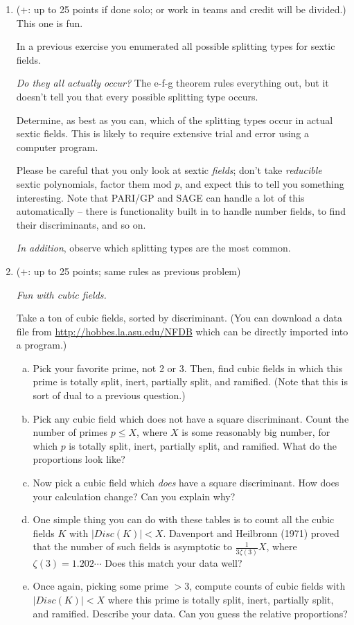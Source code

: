 \documentclass[12pt]{article}
\begin{document}
\begin{enumerate}
\item (+: up to 25 points if done solo; or work in teams and credit will be divided.)
This one is fun.

In a previous exercise you enumerated all possible splitting types for sextic fields.

{\itshape Do they all actually occur?} The e-f-g theorem rules everything out, but it doesn't tell you that
every possible splitting type occurs.

Determine, as best as you can, which of the splitting types occur in actual sextic fields. This is likely
to require extensive trial and error using a computer program.

Please be careful that you only look at sextic {\itshape fields}; don't take {\itshape reducible} sextic
polynomials, factor them mod $p$, and expect this to tell you something interesting. Note that PARI/GP and SAGE
can handle a lot of this automatically -- there is functionality built in to handle number fields, to find
their discriminants, and so on.

{\itshape In addition}, observe which splitting types are the most common. 

\item (+: up to 25 points; same rules as previous problem)

{\itshape Fun with cubic fields.}

Take a ton of cubic fields, sorted by discriminant. (You can download a data
file from \url{http://hobbes.la.asu.edu/NFDB} which can be directly imported into a program.)

\begin{enumerate}[(a)]
\item
Pick your favorite prime, not 2 or 3. Then, find cubic fields in which this prime is totally
split, inert, partially split, and ramified. (Note that this is sort of dual to a previous
question.)
\item
Pick any cubic field which does not have a square discriminant. Count the number of primes $p \leq X$,
where $X$ is some reasonably big number, for which $p$ is totally split, inert, partially split, and ramified. 
What do the proportions look like?
\item
Now pick a cubic field which {\itshape does} have a square discriminant. How does your calculation change?
Can you explain why?
\item
One simple thing you can do with these tables is to count all the cubic fields $K$ with $|Disc(K)| < X$.
Davenport and Heilbronn (1971) proved that the number of such fields is asymptotic to $\frac{1}{3 \zeta(3)} X$,
where $\zeta(3) = 1.202\cdots$ Does this match your data well?
\item
Once again, picking some prime $> 3$, compute counts of cubic fields with $|Disc(K)| < X$ where
this prime is totally split, inert, partially split, and ramified. Describe your data. Can you guess the
relative proportions?
\end{enumerate}

\end{enumerate}
\end{document}
